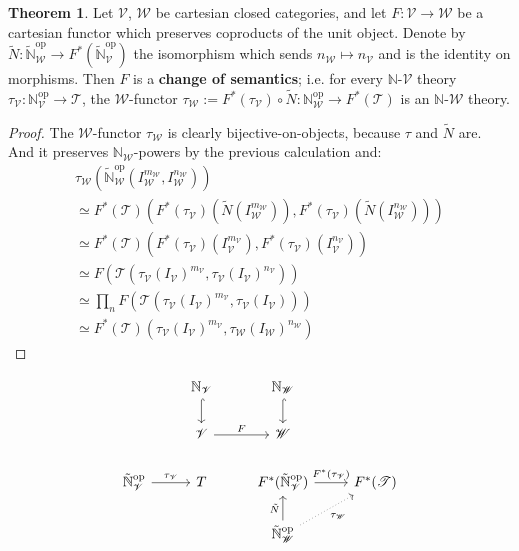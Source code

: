 \documentclass[a4paper,UKenglish]{article}
\theoremstyle{definition}
\newtheorem{theorem}{Theorem}
\newcommand{\op}{\mathrm{op}}
\newcommand{\NN}{\mathbb{N}}
\newcommand{\V}{\mathscr{V}}
\newcommand{\W}{\mathscr{W}}
\newcommand{\T}{\mathscr{T}}
\begin{document}
\begin{theorem}
	Let $\V$, $\W$ be cartesian closed categories, and let $F: \V \to \W$ be a cartesian functor which preserves coproducts of the unit object. Denote by $\tilde{N}: \tilde{\NN}_\W^\op \to F^*(\tilde{\NN}_\V^\op)$ the isomorphism which sends $n_\W \mapsto n_\V$ and is the identity on morphisms. Then $F$ is a \textbf{change of semantics}; i.e. for every $\NN$-$\V$ theory $\tau_\V: \NN_\V^\op \to \T$, the $\W$-functor $\tau_\W := F^*(\tau_\V) \circ \tilde{N}: \NN_\W^\op \to F^*(\T)$ is an $\NN$-$\W$ theory.
\end{theorem}
\begin{proof}
	The $\W$-functor $\tau_\W$ is clearly bijective-on-objects, because $\tau$ and $\tilde{N}$ are. And it preserves $\NN_\W$-powers by the previous calculation and:
\[\begin{array}{l}
	\tau_\W(\tilde{\NN}_\W^\op(I_\W^{m_\W},I_\W^{n_\W}))\\
	\simeq F^*(\T)(F^*(\tau_\V)(\tilde{N}(I_\W^{m_\W})), F^*(\tau_\V)(\tilde{N}(I_\W^{n_\W})))\\
	\simeq F^*(\T)(F^*(\tau_\V)(I_\V^{m_\V}), F^*(\tau_\V)(I_\V^{n_\V}))\\
	\simeq F(\T(\tau_\V(I_\V)^{m_\V}, \tau_\V(I_\V)^{n_\V}))\\
	\simeq \prod_n F(\T(\tau_\V(I_\V)^{m_\V}, \tau_\V(I_\V)))\\
	\simeq F^*(\T)(\tau_\V(I_\V)^{m_\V}, \tau_\W(I_\W)^{n_\W})
\end{array}\]
\end{proof}


\[\begin{tikzcd}
	& \NN_\V \arrow[hookrightarrow]{d} & \NN_\W \arrow[hookrightarrow]{d}\\
	& \V \arrow["F"]{r} & \W\\
	\tilde{\NN}_\V^\op \arrow["\tau_\V"]{r} & T & F^*(\tilde{\NN}_\V^\op) \arrow["F^*(\tau_\V)"]{r} & F^*(\T)\\
	& & \tilde{\NN}_\W^\op \arrow["\tilde{N}"]{u} \arrow[swap,dotted,"\tau_\W"]{ru}
\end{tikzcd}\]
\end{document}
